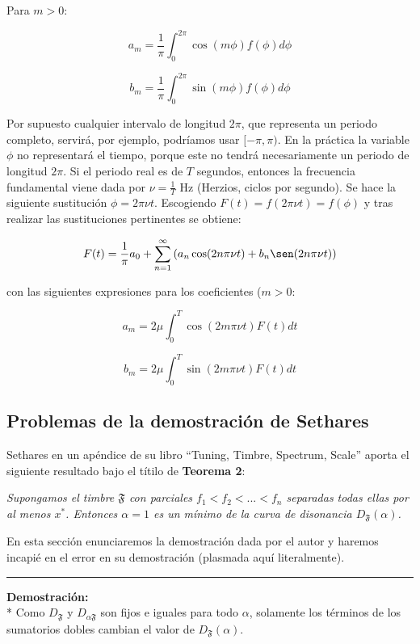 \documentclass[11pt,a4paper]{article}
\begin{document}
Para $m>0$:

$$
	a_m = \frac{1}{\pi} \int_{0}^{2\pi} {\cos(m\phi) f(\phi)} d \phi 
$$

$$
	b_m = \frac{1}{\pi} \int_{0}^{2\pi} {\sin(m \phi) f(\phi)} d \phi
$$

Por supuesto cualquier intervalo de longitud $2\pi$, que representa un periodo completo, servirá, por ejemplo, podríamos usar $[-\pi, \pi)$.
En la práctica la variable $\phi$ no representará el tiempo, porque este no tendrá necesariamente un periodo de longitud $2 \pi$. Si el periodo real es de $T$ segundos, entonces la frecuencia fundamental viene dada por $\nu = \frac{1}{T}$ Hz (Herzios, ciclos por segundo). Se hace la siguiente sustitución $\phi = 2\pi \nu t$. Escogiendo $F(t) = f( 2\pi \nu t) = f(\phi)$ y tras realizar las sustituciones pertinentes se obtiene:

$$
	F(t) = \frac{1}{\pi} a_0 + \sum_{n = 1}^{\infty} {(a_n \cos(2n\pi \nu t) + b_n \sen(2n\pi \nu t))}
$$

con las siguientes expresiones para los coeficientes ($m>0$:

$$
	a_m = 2\mu \int_{0}^{T} {\cos(2m \pi \nu t) F(t)} dt
$$

$$
	b_m = 2\mu \int_{0}^{T} {\sin(2m \pi \nu t)F(t)} dt
$$


\newpage

\subsection{Problemas de la demostración de Sethares}

    Sethares en un apéndice de su libro ``Tuning, Timbre, Spectrum, Scale'' aporta el siguiente resultado bajo el títilo de \textbf{Teorema 2}:
    
    \textsl{
    Supongamos el timbre $\mathfrak{F}$ con parciales $f_1< f_2 <... < f_n$ separadas todas ellas por al menos $x^{*}$. Entonces $\alpha = 1$ es un mínimo de la curva de disonancia $D_{\mathfrak{F}}(\alpha)$.
    }
    
    
    En esta sección enunciaremos la demostración dada por el autor y haremos incapié en el error en su demostración (plasmada aquí literalmente).
    
\noindent\rule{2cm}{0.4pt}

\noindent\textbf{Demostración:} \\* 
Como $D_{\mathfrak{F}}$ y $D_{\alpha \mathfrak{F}}$ son fijos e iguales para todo $\alpha$, solamente los términos de los sumatorios dobles cambian el valor de $D_{\mathfrak{F}}(\alpha)$.
\end{document}
